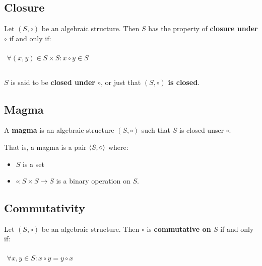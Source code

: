 \subsection{Closure}
\label{sec:closure}

Let $(S, \circ)$ be an algebraic structure. Then $S$ has the property
of \textbf{closure under $\circ$} if and only if:

\begin{math}
  \begin{array}{c}
    \\
    \forall (x, y) \in S \times S : x \circ y \in S\\
    \\
  \end{array}
\end{math}


$S$ is said to be \textbf{closed under $\circ$}, or just that
$(S, \circ)$ \textbf{is closed}.

\subsection{Magma}
\label{sec:magma}

A \textbf{magma} is an algebraic structure $(S, \circ)$ such that $S$
is closed unser $\circ$.

That is, a magma is a pair $\langle S, \circ \rangle$ where:

\begin{itemize}
\item $S$ is a set
\item $\circ: S \times S \to S $ is a binary operation on $S$.
\end{itemize}




\subsection{Commutativity}
\label{sec:commutativity}

Let $(S, \circ)$ be an algebraic structure. Then $\circ$ is
\textbf{commutative on $S$} if and only if:

\begin{math}
  \begin{array}{c}
    \\
    \forall x, y \in S: x \circ y = y \circ x\\
    \\
  \end{array}
\end{math}

